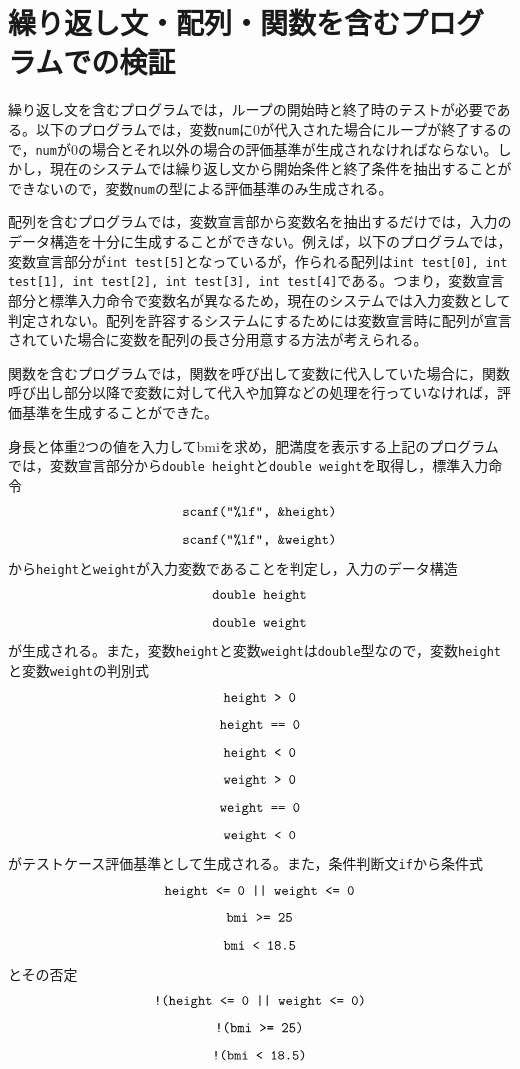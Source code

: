 \documentclass{tpu-sotu}
\begin{document}
\section{繰り返し文・配列・関数を含むプログラムでの検証}
繰り返し文を含むプログラムでは，ループの開始時と終了時のテストが必要である。以下のプログラムでは，変数{\tt num}に0が代入された場合にループが終了するので，{\tt num}が0の場合とそれ以外の場合の評価基準が生成されなければならない。しかし，現在のシステムでは繰り返し文から開始条件と終了条件を抽出することができないので，変数{\tt num}の型による評価基準のみ生成される。

配列を含むプログラムでは，変数宣言部から変数名を抽出するだけでは，入力のデータ構造を十分に生成することができない。例えば，以下のプログラムでは，変数宣言部分が{\tt int test[5]}となっているが，作られる配列は{\tt int test[0], int test[1], int test[2], int test[3], int test[4]}である。つまり，変数宣言部分と標準入力命令で変数名が異なるため，現在のシステムでは入力変数として判定されない。配列を許容するシステムにするためには変数宣言時に配列が宣言されていた場合に変数を配列の長さ分用意する方法が考えられる。

関数を含むプログラムでは，関数を呼び出して変数に代入していた場合に，関数呼び出し部分以降で変数に対して代入や加算などの処理を行っていなければ，評価基準を生成することができた。

身長と体重2つの値を入力してbmiを求め，肥満度を表示する上記のプログラムでは，変数宣言部分から{\tt double height}と{\tt double weight}を取得し，標準入力命令\\
\[ 
\mbox{{\tt {scanf("\%lf", \&height)}}}
\]
\[ 
\mbox{{\tt {scanf("\%lf", \&weight)}}}
\]
から{\tt height}と{\tt weight}が入力変数であることを判定し，入力のデータ構造\\
\[
\mbox{{\tt double height}}
\]
\[
\mbox{{\tt double weight}}
\]
が生成される。また，変数{\tt height}と変数{\tt weight}は{\tt double}型なので，変数{\tt height}と変数{\tt weight}の判別式\\
\[ 
\mbox{\tt{height > 0}} 
\]
\[
\mbox{\tt{height == 0}}
\]
\[
\mbox{\tt{height < 0}}
\]
\[ 
\mbox{\tt{weight > 0}} 
\]
\[
\mbox{\tt{weight == 0}}
\]
\[
\mbox{\tt{weight < 0}}
\]
がテストケース評価基準として生成される。また，条件判断文{\tt if}から条件式\\
\[
\mbox{\tt{height <= 0 || weight <= 0}}
\]
\[
\mbox{\tt{bmi >= 25}}
\]
\[
\mbox{\tt{bmi < 18.5}}
\]
とその否定\\
\[
\mbox{\tt{!(height <= 0 || weight <= 0)}}
\]
\[
\mbox{\tt{!(bmi >= 25)}}
\]
\[
\mbox{\tt{!(bmi < 18.5)}}
\]
\end{document}
